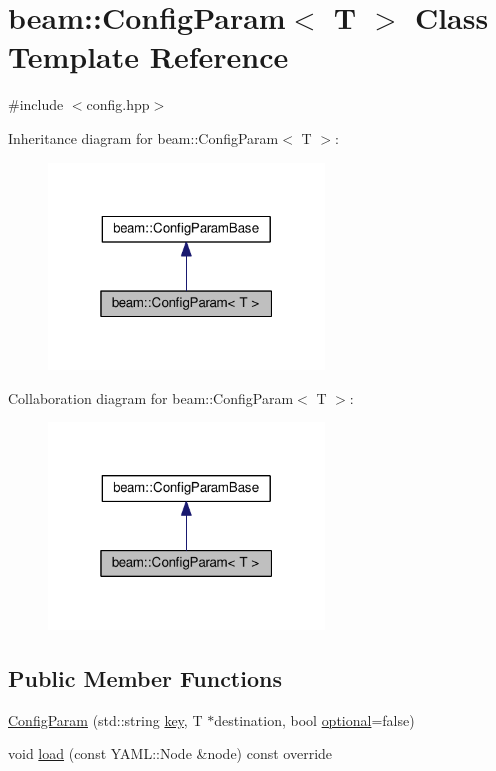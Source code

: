 \hypertarget{classbeam_1_1_config_param}{}\section{beam\+:\+:Config\+Param$<$ T $>$ Class Template Reference}
\label{classbeam_1_1_config_param}


{\ttfamily \#include $<$config.\+hpp$>$}



Inheritance diagram for beam\+:\+:Config\+Param$<$ T $>$\+:\nopagebreak
\begin{figure}[H]
\begin{center}
\leavevmode
\includegraphics[width=208pt]{classbeam_1_1_config_param__inherit__graph}
\end{center}
\end{figure}


Collaboration diagram for beam\+:\+:Config\+Param$<$ T $>$\+:\nopagebreak
\begin{figure}[H]
\begin{center}
\leavevmode
\includegraphics[width=208pt]{classbeam_1_1_config_param__coll__graph}
\end{center}
\end{figure}
\subsection*{Public Member Functions}
\begin{DoxyCompactItemize}
\item 
\hyperlink{classbeam_1_1_config_param_aaa594f071a53dfda2294c758d46a7330}{Config\+Param} (std\+::string \hyperlink{structbeam_1_1_config_param_base_afbf349bc86d925088544d04a24c484b0}{key}, T $\ast$destination, bool \hyperlink{structbeam_1_1_config_param_base_a4c73616a18786e1885265a02dbf8b9a5}{optional}=false)
\item 
void \hyperlink{classbeam_1_1_config_param_a805133e6dae35596e1383a6d223f4dc3}{load} (const Y\+A\+M\+L\+::\+Node \&node) const override
\end{DoxyCompactItemize}
